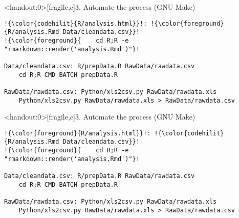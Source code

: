 \documentclass[12pt,t]{beamer}
\begin{document}
\begin{frame}<handout:0>[fragile,c]{3. Automate the process (GNU Make)}

\addtocounter{framenumber}{-1}

\begin{center}
\begin{minipage}[c]{10.8cm}
\begin{semiverbatim}
\begin{lstlisting}[escapechar=!,linewidth=10.8cm]
!{\color{codehilit}{R/analysis.html}}!: !{\color{foreground}{R/analysis.Rmd Data/cleandata.csv}}!
!{\color{foreground}{    cd R;R -e "rmarkdown::render('analysis.Rmd')"}!

Data/cleandata.csv: R/prepData.R RawData/rawdata.csv
    cd R;R CMD BATCH prepData.R

RawData/rawdata.csv: Python/xls2csv.py RawData/rawdata.xls
    Python/xls2csv.py RawData/rawdata.xls > RawData/rawdata.csv
\end{lstlisting}
\end{semiverbatim}
\end{minipage}
\end{center}

\end{frame}



\begin{frame}<handout:0>[fragile,c]{3. Automate the process (GNU Make)}

\addtocounter{framenumber}{-1}

\begin{center}
\begin{minipage}[c]{10.8cm}
\begin{semiverbatim}
\begin{lstlisting}[escapechar=!,linewidth=10.8cm]
!{\color{foreground}{R/analysis.html}}!: !{\color{codehilit}{R/analysis.Rmd Data/cleandata.csv}}!
!{\color{foreground}{    cd R;R -e "rmarkdown::render('analysis.Rmd')"}!

Data/cleandata.csv: R/prepData.R RawData/rawdata.csv
    cd R;R CMD BATCH prepData.R

RawData/rawdata.csv: Python/xls2csv.py RawData/rawdata.xls
    Python/xls2csv.py RawData/rawdata.xls > RawData/rawdata.csv
\end{lstlisting}
\end{semiverbatim}
\end{minipage}
\end{center}
\end{frame}
\end{document}
